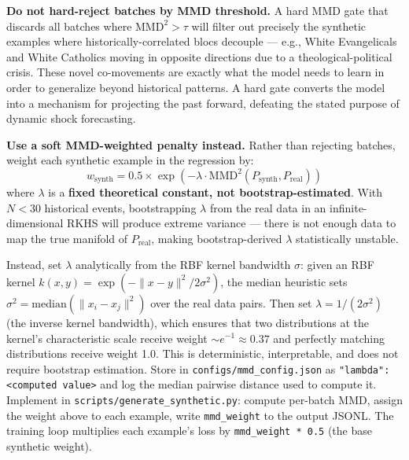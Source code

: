 \documentclass[11pt]{article}
\begin{document}
\begin{mdframed}[style=warnbox]
\textbf{Do not hard-reject batches by MMD threshold.}
A hard MMD gate that discards all batches where $\text{MMD}^2 > \tau$ will filter
out precisely the synthetic examples where historically-correlated blocs decouple
--- e.g., White Evangelicals and White Catholics moving in opposite directions
due to a theological-political crisis. These novel co-movements are exactly what
the model needs to learn in order to generalize beyond historical patterns.
A hard gate converts the model into a mechanism for projecting the past forward,
defeating the stated purpose of dynamic shock forecasting.

\textbf{Use a soft MMD-weighted penalty instead.} Rather than rejecting batches,
weight each synthetic example in the regression by:
\[
  w_{\text{synth}} = 0.5 \times \exp\!\left(-\lambda \cdot \text{MMD}^2(P_{\text{synth}},
  P_{\text{real}})\right)
\]
where $\lambda$ is a \textbf{fixed theoretical constant, not bootstrap-estimated}.
With $N < 30$ historical events, bootstrapping $\lambda$ from the real data in an
infinite-dimensional RKHS will produce extreme variance --- there is not enough data
to map the true manifold of $P_{\text{real}}$, making bootstrap-derived $\lambda$
statistically unstable.

Instead, set $\lambda$ analytically from the RBF kernel bandwidth $\sigma$:
given an RBF kernel $k(x,y) = \exp(-\|x-y\|^2 / 2\sigma^2)$, the median heuristic
sets $\sigma^2 = \text{median}(\|x_i - x_j\|^2)$ over the real data pairs.
Then set $\lambda = 1/(2\sigma^2)$ (the inverse kernel bandwidth), which ensures
that two distributions at the kernel's characteristic scale receive weight $\sim e^{-1}
\approx 0.37$ and perfectly matching distributions receive weight 1.0.
This is deterministic, interpretable, and does not require bootstrap estimation.
Store in \texttt{configs/mmd\_config.json} as \texttt{"lambda": <computed value>}
and log the median pairwise distance used to compute it.
Implement in \texttt{scripts/generate\_synthetic.py}: compute per-batch MMD,
assign the weight above to each example, write \texttt{mmd\_weight} to the
output JSONL. The training loop multiplies each example's loss by
\texttt{mmd\_weight * 0.5} (the base synthetic weight).


\end{mdframed}
\end{document}
